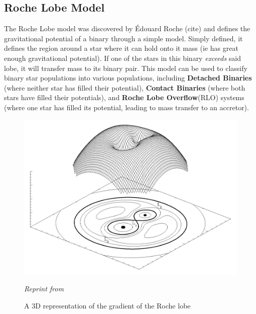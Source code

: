 \documentclass[12pt, letterpaper]{article}
\begin{document}
    \subsection{\centering Roche Lobe Model} %
    The Roche Lobe model was discovered by Édouard Roche (cite) and defines the gravitational potential of a binary through a simple model. Simply defined, it defines the region around a star where it can hold onto it mass (ie has great enough gravitational potential). If one of the stars in this binary \textit{exceeds} said lobe, it will transfer mass to its binary pair. This model can be used to classify binary star populations into various populations, including \textbf{Detached Binaries} (where neither star has filled their potential), \textbf{Contact Binaries} (where both stars have filled their potentials), and \textbf{Roche Lobe Overflow}(RLO) systems (where one star has filled its potential, leading to mass transfer to an accretor).
    

    \vspace*{\fill}
    \begin{figure}[h!]
        \centering
        \includegraphics[width=\textwidth]{Figs/RochePotential.jpg}
        \caption{ A 3D representation of the gradient of the Roche lobe}
        \label{fig:Roche_potential}
        \textit{\small Reprint from \cite{TaurisvandenHeuvel+2023}}
    \end{figure}
    \vspace*{\fill}
\end{document}

